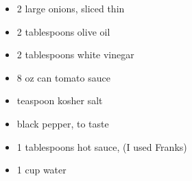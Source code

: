 \begin{itemize}
  \item 2 large onions, sliced thin
  \item 2 tablespoons olive oil
  \item 2 tablespoons white vinegar
  \item 8 oz can tomato sauce
  \item {} teaspoon kosher salt
  \item black pepper, to taste
  \item 1  tablespoons hot sauce, (I used Franks)
  \item 1  cup water
\end{itemize}
